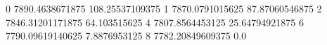 0 7890.4638671875 108.25537109375
1 7870.0791015625 87.87060546875
2 7846.31201171875 64.103515625
4 7807.8564453125 25.64794921875
6 7790.09619140625 7.8876953125
8 7782.20849609375 0.0
